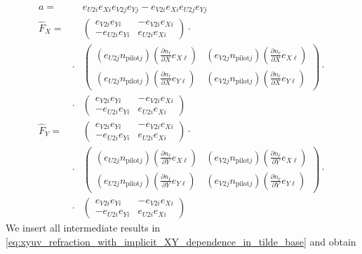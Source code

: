 \documentclass[12pt,a4paper,twoside,openright,BCOR10mm,headsepline,titlepage,abstracton,chapterprefix,final]{scrreprt}
\newcommand\pilot{\textrm{pilot}}
\begin{document}
\begin{eqnarray}
 a =&& e_{U2i} e_{Xi}e_{V2j} e_{Yj}-e_{V2i} e_{Xi}e_{U2j} e_{Yj}
 \\
 \hat{F}_X =&&
 \begin{pmatrix}
   e_{V2i} e_{Yi} & -e_{V2i} e_{Xi}
   \\
  -e_{U2i} e_{Yi}  & e_{U2i} e_{Xi}
 \end{pmatrix}
 \cdot
 \nonumber\\
 &\cdot&
 \begin{pmatrix}
  (e_{U2j} n_{\pilot j}) (\frac{\partial n_\ell}{\partial X} e_{X\ell}) &  (e_{V2j} n_{\pilot j}) (\frac{\partial n_\ell}{\partial X} e_{X\ell})
   \\
  (e_{U2j} n_{\pilot j}) (\frac{\partial n_\ell}{\partial X} e_{Y\ell}) &  (e_{V2j} n_{\pilot j}) (\frac{\partial n_\ell}{\partial X} e_{Y\ell})
 \end{pmatrix}
 \cdot
 \nonumber\\
 &\cdot&
 \begin{pmatrix}
   e_{V2i} e_{Yi} & -e_{V2i} e_{Xi}
   \\
  -e_{U2i} e_{Yi}  & e_{U2i} e_{Xi}
 \end{pmatrix} 
\\
\hat{F}_Y =&&
 \begin{pmatrix}
   e_{V2i} e_{Yi} & -e_{V2i} e_{Xi}
   \\
  -e_{U2i} e_{Yi}  & e_{U2i} e_{Xi}
 \end{pmatrix} 
 \cdot
 \nonumber\\
 &\cdot&
 \begin{pmatrix}
  (e_{U2j} n_{\pilot j}) (\frac{\partial n_\ell}{\partial Y} e_{X\ell}) &  (e_{V2j} n_{\pilot j}) (\frac{\partial n_\ell}{\partial Y} e_{X\ell})
   \\
  (e_{U2j} n_{\pilot j}) (\frac{\partial n_\ell}{\partial Y} e_{Y\ell}) &  (e_{V2j} n_{\pilot j}) (\frac{\partial n_\ell}{\partial Y} e_{Y\ell})
 \end{pmatrix}
 \cdot
 \nonumber\\
 &\cdot&
 \begin{pmatrix}
   e_{V2i} e_{Yi} & -e_{V2i} e_{Xi}
   \\
  -e_{U2i} e_{Yi}  & e_{U2i} e_{Xi}
 \end{pmatrix} 
\end{eqnarray}
We insert all intermediate results in \eqref{eq:xyuv_refraction_with_implicit_XY_dependence_in_tilde_base} and obtain
\end{document}
